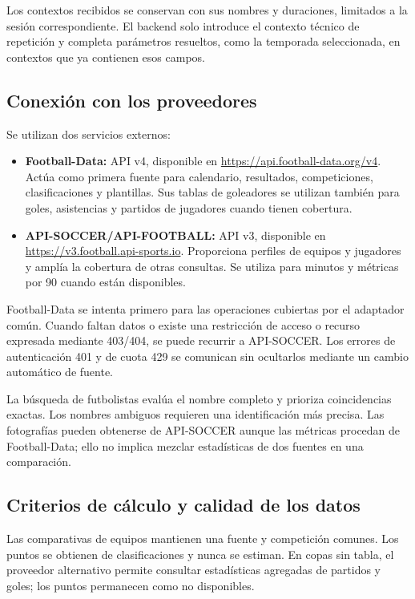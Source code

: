 \documentclass[11pt,a4paper]{article}
\begin{document}
Los contextos recibidos se conservan con sus nombres y duraciones, limitados a la sesión correspondiente. El backend solo introduce el contexto técnico de repetición y completa parámetros resueltos, como la temporada seleccionada, en contextos que ya contienen esos campos.

\subsection{Conexión con los proveedores}

Se utilizan dos servicios externos:
\begin{itemize}
\item \textbf{Football-Data:} API v4, disponible en \url{https://api.football-data.org/v4}. Actúa como primera fuente para calendario, resultados, competiciones, clasificaciones y plantillas. Sus tablas de goleadores se utilizan también para goles, asistencias y partidos de jugadores cuando tienen cobertura.
\item \textbf{API-SOCCER/API-FOOTBALL:} API v3, disponible en \url{https://v3.football.api-sports.io}. Proporciona perfiles de equipos y jugadores y amplía la cobertura de otras consultas. Se utiliza para minutos y métricas por 90 cuando están disponibles.
\end{itemize}

Football-Data se intenta primero para las operaciones cubiertas por el adaptador común. Cuando faltan datos o existe una restricción de acceso o recurso expresada mediante 403/404, se puede recurrir a API-SOCCER. Los errores de autenticación 401 y de cuota 429 se comunican sin ocultarlos mediante un cambio automático de fuente.

La búsqueda de futbolistas evalúa el nombre completo y prioriza coincidencias exactas. Los nombres ambiguos requieren una identificación más precisa. Las fotografías pueden obtenerse de API-SOCCER aunque las métricas procedan de Football-Data; ello no implica mezclar estadísticas de dos fuentes en una comparación.

\subsection{Criterios de cálculo y calidad de los datos}

Las comparativas de equipos mantienen una fuente y competición comunes. Los puntos se obtienen de clasificaciones y nunca se estiman. En copas sin tabla, el proveedor alternativo permite consultar estadísticas agregadas de partidos y goles; los puntos permanecen como no disponibles.
\end{document}
